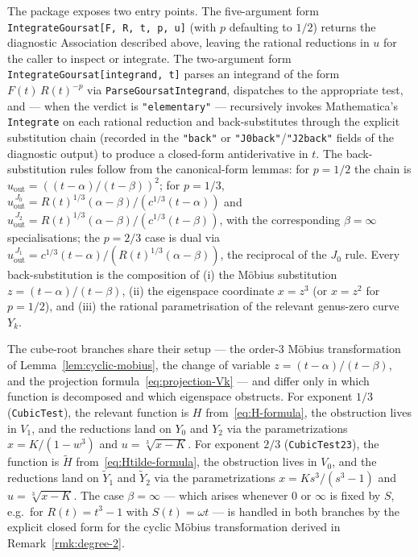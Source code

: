 \documentclass[11pt,a4paper]{article}
\theoremstyle{plain}
\theoremstyle{definition}
\theoremstyle{remark}
\begin{document}
The package exposes two entry points. The five-argument form \texttt{IntegrateGoursat[F, R, t, p, u]} (with $p$ defaulting to $1/2$) returns the diagnostic Association described above, leaving the rational reductions in $u$ for the caller to inspect or integrate. The two-argument form \texttt{IntegrateGoursat[integrand, t]} parses an integrand of the form $F(t)\,R(t)^{-p}$ via \texttt{ParseGoursatIntegrand}, dispatches to the appropriate test, and --- when the verdict is \texttt{"elementary"} --- recursively invokes Mathematica's \texttt{Integrate} on each rational reduction and back-substitutes through the explicit substitution chain (recorded in the \texttt{"back"} or \texttt{"J0back"}/\texttt{"J2back"} fields of the diagnostic output) to produce a closed-form antiderivative in $t$. The back-substitution rules follow from the canonical-form lemmas: for $p = 1/2$ the chain is $u_{\text{out}} = ((t-\alpha)/(t-\beta))^2$; for $p = 1/3$, $u_{\text{out}}^{\,J_0} = R(t)^{1/3}(\alpha-\beta)/(c^{1/3}(t-\alpha))$ and $u_{\text{out}}^{\,J_2} = R(t)^{1/3}(\alpha-\beta)/(c^{1/3}(t-\beta))$, with the corresponding $\beta = \infty$ specialisations; the $p = 2/3$ case is dual via $u_{\text{out}}^{\,J_1} = c^{1/3}(t-\alpha)/(R(t)^{1/3}(\alpha-\beta))$, the reciprocal of the $J_0$ rule. Every back-substitution is the composition of (i) the M\"obius substitution $z = (t-\alpha)/(t-\beta)$, (ii) the eigenspace coordinate $x = z^3$ (or $x = z^2$ for $p = 1/2$), and (iii) the rational parametrisation of the relevant genus-zero curve $Y_k$.

The cube-root branches share their setup --- the order-$3$ M\"obius transformation of Lemma~\ref{lem:cyclic-mobius}, the change of variable $z=(t-\alpha)/(t-\beta)$, and the projection formula~\eqref{eq:projection-Vk} --- and differ only in which function is decomposed and which eigenspace obstructs. For exponent $1/3$ (\texttt{CubicTest}), the relevant function is $H$ from~\eqref{eq:H-formula}, the obstruction lives in $V_1$, and the reductions land on $Y_0$ and $Y_2$ via the parametrizations $x=K/(1-w^3)$ and $u=\sqrt[3]{x-K}$. For exponent $2/3$ (\texttt{CubicTest23}), the function is $\widetilde H$ from~\eqref{eq:Htilde-formula}, the obstruction lives in $V_0$, and the reductions land on $\widetilde Y_1$ and $\widetilde Y_2$ via the parametrizations $x=Ks^3/(s^3-1)$ and $u=\sqrt[3]{x-K}$. The case $\beta=\infty$ --- which arises whenever $0$ or $\infty$ is fixed by $S$, e.g.\ for $R(t)=t^3-1$ with $S(t)=\omega t$ --- is handled in both branches by the explicit closed form for the cyclic M\"obius transformation derived in Remark~\ref{rmk:degree-2}.
\end{document}
